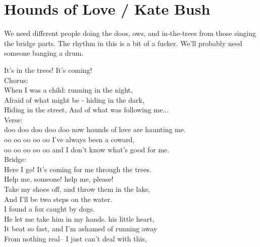 \section{Hounds of Love / Kate Bush}\label{sec:hounds_of_love}
  {\small We need different people doing the doos, ows, and in-the-trees from those singing the bridge parts. The rhythm in this is a bit of a fucker. We'll probably need someone banging a drum.}
  
  \Fmajor
  \Cmajor
  \BflatMajor
  \Aminor
  \DminorSeven
  
  It's in the trees!
  It's coming!\\
  Chorus:\\
  When I was a child:
  running in the night,\\
  Afraid of what might be -
  hiding in the dark,\\
  Hiding in the street,
  And of what was following me...\\
  Verse:\\
  doo doo doo doo doo
  now hounds of love are haunting me. \\
  oo oo oo oo oo 
  I've always been a coward,\\
  oo oo oo oo oo 
  and I don't know what's good for me.\\
  Bridge:\\
  Here I go!
  It's coming for me through the trees.\\
  Help me, someone!
  help me, please!\\
  Take my shoes off,
  and throw them in the lake,\\
  And I'll be
  two steps on the water.\\
  I found a fox
  caught by dogs.\\
  He let me take him in my hands.
  his little heart,\\
  It beat so fast,
  and I'm ashamed of running away\\
  From nothing real--
  I just can't deal with this,\\
